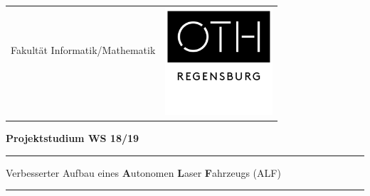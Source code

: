 

\titlepage

\begin{center}

\begin{tabular}{cc}
& \multirow{5}{*}{
\includegraphics[height=4.0cm]{images/cover_sheet/OTH_Regensburg_neues_Logo_01}}\tabularnewline

{\large{}Fakultät Informatik/Mathematik}\hspace{1.5cm} & \tabularnewline
 & \tabularnewline
 & \tabularnewline
 & \tabularnewline
\end{tabular}
\par\end{center}

\noindent 
\vspace{0.7cm}


\noindent \begin{center}
\textbf{\huge{}Projektstudium WS 18/19}
\par\end{center}{\Large \par}
\vspace{1.3cm}

\noindent
\rule{\textwidth}{0.3pt}
\vspace{0.1cm}

\begin{doublespace}
\noindent \begin{center}
{\Large{Verbesserter Aufbau eines \textbf{A}utonomen \textbf{L}aser \textbf{F}ahrzeugs (ALF)}}
\par\end{center}{\large \par}
\end{doublespace}
\noindent\rule{\textwidth}{0.3pt}




\vspace{2.6cm}


